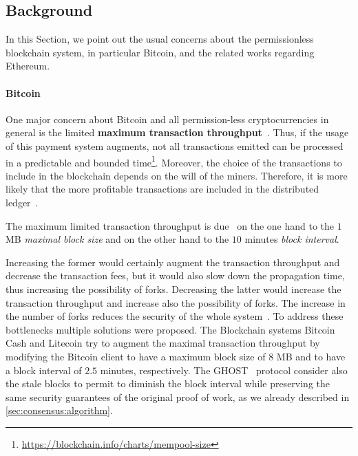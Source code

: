 \subsection{Background}
\label{sec:background}

In this Section, we point out the usual concerns about the permissionless 
blockchain system, in particular Bitcoin, and the related works regarding 
Ethereum.

\paragraph{Bitcoin} One major concern about Bitcoin and all permission-less
cryptocurrencies in general is the limited \textbf{maximum transaction
throughput}~\cite{bib:blockchain-challenges-opportunites-survey, bib:taxonomy,
bib:scaling-croman}. Thus, if the usage of this payment system augments, not all
transactions emitted can be processed in a predictable and bounded
time\footnote{\url{https://blockchain.info/charts/mempool-size}}. Moreover, the
choice of the transactions to include in the blockchain depends on the will of
the miners. Therefore, it is more likely that the more profitable transactions
are included in the distributed
ledger~\cite{bib:blockchain-challenges-opportunites-survey,wood2018ethereum}.

The maximum limited transaction throughput is due~\cite{bib:ghost,
bib:scaling-croman} on the one hand to the $1$ MB \emph{maximal block size}
and on the other hand to the $10$ minutes \emph{block interval}.

Increasing the former would certainly augment the transaction throughput and
decrease the transaction fees, but it would also slow down the propagation time,
thus increasing the possibility of forks. Decreasing the latter would increase
the transaction throughput and increase also the possibility of forks. The
increase in the number of forks reduces the security of the whole
system~\cite{bib:ghost}. To address these bottlenecks multiple solutions were
proposed. The Blockchain systems Bitcoin Cash and Litecoin try to augment the
maximal transaction throughput by modifying the Bitcoin client to have a maximum
block size of $8$ MB and to have a block interval of $2.5$ minutes,
respectively. The GHOST~\cite{bib:ghost} protocol consider also the stale blocks
to permit to diminish the block interval while preserving the same security
guarantees of the original proof of work, as we already described in
\autoref{sec:consensus:algorithm}.


